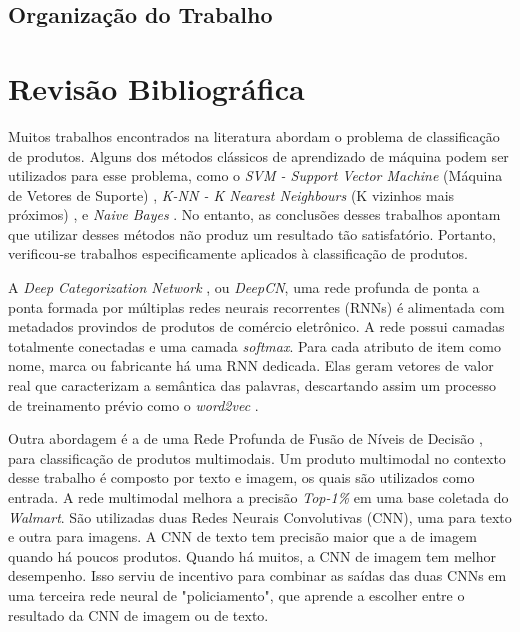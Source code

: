 \documentclass[
	12pt,				%
	openright,			%
	oneside,
	a4paper,				%
	english,				%
	brazil				%
]{abntex2/abntex2} %
\begin{document}
	\section{Organização do Trabalho}


\chapter{Revisão Bibliográfica}

	Muitos trabalhos encontrados na literatura abordam o problema de classificação de produtos. Alguns dos métodos clássicos de aprendizado de máquina podem ser utilizados para esse problema, como o \emph{SVM - Support Vector Machine} (Máquina de Vetores de Suporte) \cite{Joachims:1998}, \emph{K-NN - K Nearest Neighbours} (K vizinhos mais próximos) \cite{Chakrabarti:2003}, e \emph{Naive Bayes} \cite{rish2001empirical}. No entanto, as conclusões desses trabalhos apontam que utilizar desses métodos não produz um resultado tão satisfatório. Portanto, verificou-se trabalhos especificamente aplicados à classificação de produtos.

	A \emph{Deep Categorization Network} \cite{conf/kdd/2016}, ou \emph{DeepCN}, uma rede profunda de ponta a ponta formada por múltiplas redes neurais recorrentes (RNNs) é alimentada com metadados provindos de produtos de comércio eletrônico. A rede possui camadas totalmente conectadas e uma camada \emph{softmax}. Para cada atributo de item como nome, marca ou fabricante há uma RNN dedicada. Elas geram vetores de valor real que caracterizam a semântica das palavras, descartando assim um processo de treinamento prévio como o \emph{word2vec} \cite{mikolov2013distributed}.

	Outra abordagem é a de uma Rede Profunda de Fusão de Níveis de Decisão \cite{ZahavyMKM16}, para classificação de produtos multimodais. Um produto multimodal no contexto desse trabalho é composto por texto e imagem, os quais são utilizados como entrada. A rede multimodal melhora a precisão \emph{Top-1\%} em uma base coletada do \emph{Walmart}. São utilizadas duas Redes Neurais Convolutivas (CNN), uma para texto e outra para imagens. A CNN de texto tem precisão maior que a de imagem quando há poucos produtos. Quando há muitos, a CNN de imagem tem melhor desempenho. Isso serviu de incentivo para combinar as saídas das duas CNNs em uma terceira rede neural de "policiamento", que aprende a escolher entre o resultado da CNN de imagem ou de texto.
\end{document}
